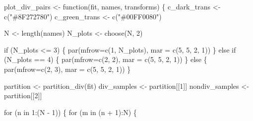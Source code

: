 \documentclass[
  letterpaper,
  DIV=11,
  numbers=noendperiod]{scrartcl}
\newenvironment{Shaded}{\begin{snugshade}}{\end{snugshade}}
\newcommand{\AttributeTok}[1]{\textcolor[rgb]{0.40,0.45,0.13}{#1}}
\newcommand{\ControlFlowTok}[1]{\textcolor[rgb]{0.00,0.23,0.31}{#1}}
\newcommand{\DecValTok}[1]{\textcolor[rgb]{0.68,0.00,0.00}{#1}}
\newcommand{\FunctionTok}[1]{\textcolor[rgb]{0.28,0.35,0.67}{#1}}
\newcommand{\NormalTok}[1]{\textcolor[rgb]{0.00,0.23,0.31}{#1}}
\newcommand{\OtherTok}[1]{\textcolor[rgb]{0.00,0.23,0.31}{#1}}
\newcommand{\SpecialCharTok}[1]{\textcolor[rgb]{0.37,0.37,0.37}{#1}}
\newcommand{\StringTok}[1]{\textcolor[rgb]{0.13,0.47,0.30}{#1}}
\begin{document}
\begin{Shaded}
\begin{Highlighting}[]
\NormalTok{plot\_div\_pairs }\OtherTok{\textless{}{-}} \ControlFlowTok{function}\NormalTok{(fit, names, transforms) \{}
\NormalTok{  c\_dark\_trans }\OtherTok{\textless{}{-}} \FunctionTok{c}\NormalTok{(}\StringTok{"\#8F272780"}\NormalTok{)}
\NormalTok{  c\_green\_trans }\OtherTok{\textless{}{-}} \FunctionTok{c}\NormalTok{(}\StringTok{"\#00FF0080"}\NormalTok{)}

\NormalTok{  N }\OtherTok{\textless{}{-}} \FunctionTok{length}\NormalTok{(names)}
\NormalTok{  N\_plots }\OtherTok{\textless{}{-}} \FunctionTok{choose}\NormalTok{(N, }\DecValTok{2}\NormalTok{)}

  \ControlFlowTok{if}\NormalTok{ (N\_plots }\SpecialCharTok{\textless{}=} \DecValTok{3}\NormalTok{) \{}
    \FunctionTok{par}\NormalTok{(}\AttributeTok{mfrow=}\FunctionTok{c}\NormalTok{(}\DecValTok{1}\NormalTok{, N\_plots), }\AttributeTok{mar =} \FunctionTok{c}\NormalTok{(}\DecValTok{5}\NormalTok{, }\DecValTok{5}\NormalTok{, }\DecValTok{2}\NormalTok{, }\DecValTok{1}\NormalTok{))}
\NormalTok{  \} }\ControlFlowTok{else} \ControlFlowTok{if}\NormalTok{ (N\_plots }\SpecialCharTok{==} \DecValTok{4}\NormalTok{) \{}
    \FunctionTok{par}\NormalTok{(}\AttributeTok{mfrow=}\FunctionTok{c}\NormalTok{(}\DecValTok{2}\NormalTok{, }\DecValTok{2}\NormalTok{), }\AttributeTok{mar =} \FunctionTok{c}\NormalTok{(}\DecValTok{5}\NormalTok{, }\DecValTok{5}\NormalTok{, }\DecValTok{2}\NormalTok{, }\DecValTok{1}\NormalTok{))}
\NormalTok{  \} }\ControlFlowTok{else}\NormalTok{ \{}
    \FunctionTok{par}\NormalTok{(}\AttributeTok{mfrow=}\FunctionTok{c}\NormalTok{(}\DecValTok{2}\NormalTok{, }\DecValTok{3}\NormalTok{), }\AttributeTok{mar =} \FunctionTok{c}\NormalTok{(}\DecValTok{5}\NormalTok{, }\DecValTok{5}\NormalTok{, }\DecValTok{2}\NormalTok{, }\DecValTok{1}\NormalTok{))}
\NormalTok{  \}}

\NormalTok{  partition }\OtherTok{\textless{}{-}} \FunctionTok{partition\_div}\NormalTok{(fit)}
\NormalTok{  div\_samples }\OtherTok{\textless{}{-}}\NormalTok{ partition[[}\DecValTok{1}\NormalTok{]]}
\NormalTok{  nondiv\_samples }\OtherTok{\textless{}{-}}\NormalTok{ partition[[}\DecValTok{2}\NormalTok{]]}

  \ControlFlowTok{for}\NormalTok{ (n }\ControlFlowTok{in} \DecValTok{1}\SpecialCharTok{:}\NormalTok{(N }\SpecialCharTok{{-}} \DecValTok{1}\NormalTok{)) \{}
    \ControlFlowTok{for}\NormalTok{ (m }\ControlFlowTok{in}\NormalTok{ (n }\SpecialCharTok{+} \DecValTok{1}\NormalTok{)}\SpecialCharTok{:}\NormalTok{N) \{}
    

\end{Highlighting}
\end{Shaded}
\end{document}
